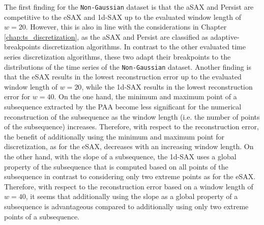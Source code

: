 The first finding for the \texttt{Non-Gaussian} dataset is that the \ac{aSAX} and Persist are competitive to the \ac{eSAX} and \ac{1d-SAX} up to the evaluated window length of $w = 20$. However, this is also in line with the considerations in Chapter \ref{chap:ts_discretization}, as the \ac{aSAX} and Persist are classified as adaptive-breakpoints discretization algorithms. In contrast to the other evaluated time series discretization algorithms, these two adapt their breakpoints to the distributions of the time series of the \texttt{Non-Gaussian} dataset. Another finding is that the \ac{eSAX} results in the lowest reconstruction error up to the evaluated window length of $w = 20$, while the \ac{1d-SAX} results in the lowest reconstruction error for $w = 40$. On the one hand, the minimum and maximum point of a subsequence extracted by the \ac{PAA} become less significant for the numerical reconstruction of the subsequence as the window length (i.e. the number of points of the subsequence) increases. Therefore, with respect to the reconstruction error, the benefit of additionally using the minimum and maximum point for discretization, as for the \ac{eSAX}, decreases with an increasing window length. On the other hand, with the slope of a subsequence, the \ac{1d-SAX} uses a global property of the subsequence that is computed based on all points of the subsequence in contrast to considering only two extreme points as for the \ac{eSAX}. Therefore, with respect to the reconstruction error based on a window length of $w = 40$, it seems that additionally using the slope as a global property of a subsequence is advantageous compared to additionally using only two extreme points of a subsequence. \newline
